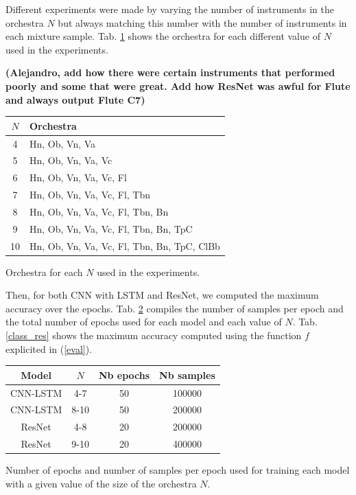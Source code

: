 \documentclass{article}
\begin{document}
Different experiments were made by varying the number of instruments in the orchestra $N$ but always matching this number with the number of instruments in each mixture sample. Tab. \ref{exp_tab} shows the orchestra for each different value of $N$ used in the experiments.

\textbf{(Alejandro, add how there were certain instruments that performed poorly and some that were great. Add how ResNet was awful for Flute and always output Flute C7)}

\begin{table}
\begin{tabular}{|c|l|}
\hline
$N$ & Orchestra\\
\hline
4 & Hn, Ob, Vn, Va\\
5 & Hn, Ob, Vn, Va, Vc\\
6 & Hn, Ob, Vn, Va, Vc, Fl\\
7 & Hn, Ob, Vn, Va, Vc, Fl, Tbn\\
8 & Hn, Ob, Vn, Va, Vc, Fl, Tbn, Bn\\
9 & Hn, Ob, Vn, Va, Vc, Fl, Tbn, Bn, TpC\\
10 & Hn, Ob, Vn, Va, Vc, Fl, Tbn, Bn, TpC, ClBb\\
\hline
\end{tabular}

\begin{caption}
Orchestra for each $N$ used in the experiments.
\label{exp_tab}
\end{caption}
\end{table}

Then, for both CNN with LSTM and ResNet, we computed the maximum accuracy over the epochs. Tab. \ref{epoch} compiles the number of samples per epoch and the total number of epochs used for each model and each value of $N$. Tab. \ref{class_res} shows the maximum accuracy computed using the function $f$ explicited in (\ref{eval}).



\begin{table}
\begin{tabular}{|c|c|c|c|}
\hline
Model & $N$ & Nb epochs & Nb samples\\
\hline
CNN-LSTM & 4-7 & 50 & 100000 \\
CNN-LSTM & 8-10 & 50 & 200000 \\
ResNet & 4-8 & 20 & 200000 \\
ResNet & 9-10 & 20 & 400000 \\
\hline
\end{tabular}

\begin{caption}
Number of epochs and number of samples per epoch used for training each model with a given value of the size of the orchestra $N$.
\label{epoch}
\end{caption}
\end{table}
\end{document}
